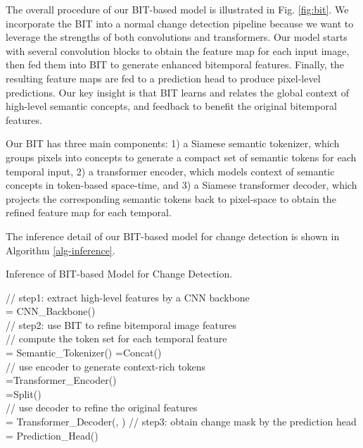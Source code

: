 \documentclass[journal]{IEEEtran}
\begin{document}
The overall procedure of our BIT-based model is illustrated in Fig. \ref{fig:bit}. We incorporate the BIT into a normal change detection pipeline because we want to leverage the strengths of both convolutions and transformers. Our model starts with several convolution blocks to obtain the feature map for each input image, then fed them into BIT to generate enhanced bitemporal features. Finally, the resulting feature maps are fed to a prediction head to produce pixel-level predictions. Our key insight is that BIT learns and relates the global context of high-level semantic concepts, and feedback to benefit the original bitemporal features.

Our BIT has three main components: 1) a Siamese semantic tokenizer, which groups pixels into concepts to generate a compact set of semantic tokens for each temporal input, 2) a transformer encoder, which models context of semantic concepts in token-based space-time, and 3) a Siamese transformer decoder, which projects the corresponding semantic tokens back to pixel-space to obtain the refined feature map for each temporal.

The inference detail of our BIT-based model for change detection is shown in Algorithm \ref{alg-inference}. 

\begin{algorithm}
\caption{Inference of BIT-based Model for Change Detection.} 
\label{alg-inference} 
\BlankLine
    // step1: extract high-level features by a CNN backbone \\
    {
         = CNN\_Backbone()  \\
    }
    // step2: use BIT to refine bitemporal image features \\
    // compute the token set for each temporal feature \\
    {
         = Semantic\_Tokenizer()
    }
    =Concat() \\
    // use encoder to generate context-rich tokens \\
    =Transformer\_Encoder() \\
    =Split() \\
    // use decoder to refine the original features \\
    {
         = Transformer\_Decoder(, )
    }
    // step3: obtain change mask by the prediction head \\
     = Prediction\_Head()
   
\end{algorithm}
\end{document}
